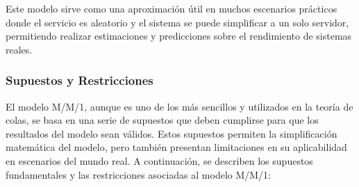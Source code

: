 \documentclass{article}
\begin{document}
\begin{itemize}
    Este modelo sirve como una aproximación útil en muchos escenarios prácticos donde el servicio es aleatorio y el sistema se puede simplificar a un solo servidor, permitiendo realizar estimaciones y predicciones sobre el rendimiento de sistemas reales.
\end{itemize}

\subsubsection{Supuestos y Restricciones}

El modelo M/M/1, aunque es uno de los más sencillos y utilizados en la teoría de colas, se basa en una serie de supuestos que deben cumplirse para que los resultados del modelo sean válidos. Estos supuestos permiten la simplificación matemática del modelo, pero también presentan limitaciones en su aplicabilidad en escenarios del mundo real. A continuación, se describen los supuestos fundamentales y las restricciones asociadas al modelo M/M/1:
\end{document}
